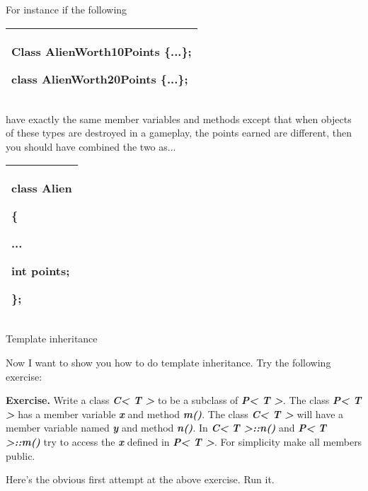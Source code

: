 \documentclass[
]{article}
\begin{document}
For instance if the following

\begin{longtable}[]{@{}l@{}}
\toprule
\endhead
\begin{minipage}[t]{0.97\columnwidth}\raggedright
Class AlienWorth10Points \{...\};

class AlienWorth20Points \{...\};\strut
\end{minipage}\tabularnewline
\bottomrule
\end{longtable}

have exactly the same member variables and methods except that when
objects of these types are destroyed in a gameplay, the points earned
are different, then you should have combined the two as...

\begin{longtable}[]{@{}l@{}}
\toprule
\endhead
\begin{minipage}[t]{0.97\columnwidth}\raggedright
class Alien

\{

...

int points;

\};\strut
\end{minipage}\tabularnewline
\bottomrule
\end{longtable}

Template inheritance

Now I want to show you how to do template inheritance. Try the following
exercise:

\textbf{Exercise.} Write a class \emph{\textbf{C\textless{} T
\textgreater{}}} to be a subclass of \emph{\textbf{P\textless{} T
\textgreater{}}}. The class \emph{\textbf{P\textless{} T
\textgreater{}}} has a member variable \emph{\textbf{x}} and method
\emph{\textbf{m()}}. The class \emph{\textbf{C\textless{} T
\textgreater{}}}\textbf{ }will have a member variable named
\emph{\textbf{y}} and method \emph{\textbf{n()}}. In
\emph{\textbf{C\textless{} }\textbf{T \textgreater{}}\textbf{::n()}}
and\emph{\textbf{ P}\textbf{\textless{} }\textbf{T
\textgreater{}}\textbf{::}\textbf{m}\textbf{()}} try to access the
\emph{\textbf{x}} defined in \emph{\textbf{P\textless{} T
\textgreater{}}}. For simplicity make all members public.

Here's the obvious first attempt at the above exercise. Run it.
\end{document}
